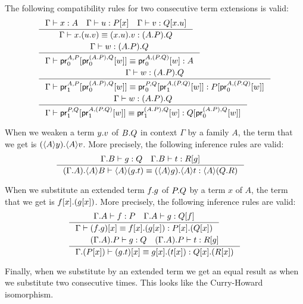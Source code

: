 \begin{lem}
The following compatibility rules for two consecutive term extensions is valid:
\begin{align*}
& \inference{\jterm{\Gamma}{A}{x}\quad\jterm{\Gamma}{\subst{x}{P}}{u}\quad\jterm{\Gamma}{\subst{\ctxext{x}{u}}{Q}}{v}}
{\jtermeq{\Gamma}{\ctxext{{A}{P}}{Q}}{\ctxext{x}{{u}{v}}}{\ctxext{{x}{u}}{v}}}\\
& \inference{\jterm{\Gamma}{\ctxext{{A}{P}}{Q}}{w}}
  {\jtermeq{\Gamma}{A}{\cprojfst{A}{P}{\cprojfst{\ctxext{A}{P}}{Q}{w}}}{\cprojfst{A}{\ctxext{P}{Q}}{w}}}\\
& \inference{\jterm{\Gamma}{\ctxext{{A}{P}}{Q}}{w}}
  {\jtermeq{\Gamma}{\subst{\cprojfst{A}{\ctxext{P}{Q}}{w}}{P}}
  {\cprojsnd{A}{P}{\cprojfst{\ctxext{A}{P}}{Q}{w}}}
  {\cprojfst{P}{Q}{\cprojsnd{A}{\ctxext{P}{Q}}{w}}}}\\
& \inference{\jterm{\Gamma}{\ctxext{{A}{P}}{Q}}{w}}
  {\jtermeq{\Gamma}{\subst{\cprojfst{\ctxext{A}{P}}{Q}{w}}{Q}}
  {\cprojsnd{P}{Q}{\cprojsnd{A}{\ctxext{P}{Q}}{w}}}
  {\cprojsnd{\ctxext{A}{P}}{Q}{w}}}
\end{align*}
\end{lem}

\begin{lem}
When we weaken a term $\ctxext{y}{v}$ of $\ctxext{B}{Q}$ in context $\Gamma$ by
a family $A$, the term that we get is $\ctxext{\ctxwk{A}{y}}{\ctxwk{A}{v}}$. More
precisely, the following inference rules are valid:
\begin{align*}
& \inference{\jterm{\ctxext{\Gamma}{B}}{Q}{g}\quad\jterm{\ctxext{\Gamma}{B}}{\subst{g}{R}}{t}}{\jtermeq{\ctxext{{\Gamma}{A}}{\ctxwk{A}{B}}}{\ctxwk{A}{\ctxext{Q}{R}}}{\ctxwk{A}{\ctxext{g}{t}}}{\ctxext{\ctxwk{A}{g}}{\ctxwk{A}{t}}}}
\end{align*}
\end{lem}

\begin{lem}
When we substitute an extended term $\ctxext{f}{g}$ of $\ctxext{P}{Q}$ by a term
$x$ of $A$, the term that we get is $\ctxext{\subst{x}{f}}{\subst{x}{g}}$.
More precisely, the following inference rules are valid:
\begin{align*}
& \inference{\jterm{\ctxext{\Gamma}{A}}{P}{f}\quad\jterm{\ctxext{\Gamma}{A}}{\subst{f}{Q}}{g}}{\jtermeq{\Gamma}{\ctxext{\subst{x}{P}}{\subst{x}{Q}}}{\subst{x}{\ctxext{f}{g}}}{\ctxext{\subst{x}{f}}{\subst{x}{g}}}}\\
& \inference{\jterm{\ctxext{{\Gamma}{A}}{P}}{Q}{g}\quad\jterm{\ctxext{{\Gamma}{A}}{P}}{\subst{g}{R}}{t}}{\jtermeq{\ctxext{\Gamma}{\subst{x}{P}}}{\ctxext{\subst{x}{Q}}{\subst{x}{R}}}{\subst{x}{\ctxext{g}{t}}}{\ctxext{\subst{x}{g}}{\subst{x}{t}}}}
\end{align*}
\end{lem}
Finally, when we substitute by an extended term we get an equal result as when we
substitute two consecutive times. This looks like the Curry-Howard isomorphism.

